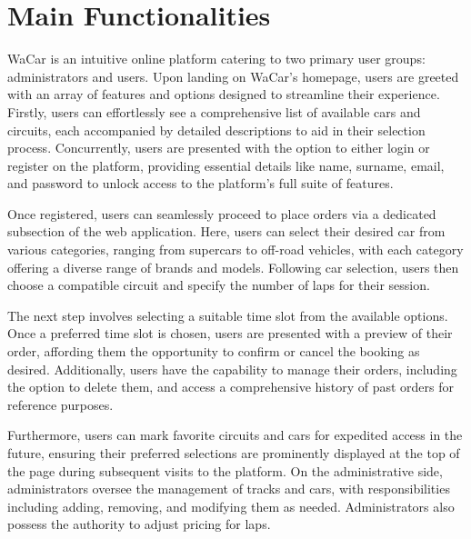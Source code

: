 \section{Main Functionalities}


WaCar is an intuitive online platform catering to two primary user groups: administrators and users. Upon landing on WaCar's homepage, users are greeted with an array of features and options designed to streamline their experience. Firstly, users can effortlessly see a comprehensive list of available cars and circuits, each accompanied by detailed descriptions to aid in their selection process. Concurrently, users are presented with the option to either login or register on the platform, providing essential details like name, surname, email, and password to unlock access to the platform's full suite of features.

Once registered, users can seamlessly proceed to place orders via a dedicated subsection of the web application. Here, users can select their desired car from various categories, ranging from supercars to off-road vehicles, with each category offering a diverse range of brands and models. Following car selection, users then choose a compatible circuit and specify the number of laps for their session.

The next step involves selecting a suitable time slot from the available options. Once a preferred time slot is chosen, users are presented with a preview of their order, affording them the opportunity to confirm or cancel the booking as desired. Additionally, users have the capability to manage their orders, including the option to delete them, and access a comprehensive history of past orders for reference purposes.

Furthermore, users can mark favorite circuits and cars for expedited access in the future, ensuring their preferred selections are prominently displayed at the top of the page during subsequent visits to the platform. On the administrative side, administrators oversee the management of tracks and cars, with responsibilities including adding, removing, and modifying them as needed. Administrators also possess the authority to adjust pricing for laps.